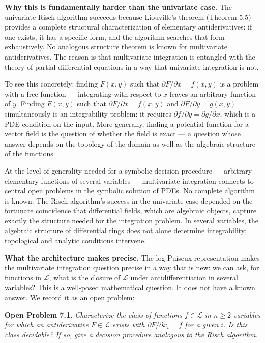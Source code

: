 \documentclass[12pt]{article}
\begin{document}
\textbf{Why this is fundamentally harder than the univariate case.} The
univariate Risch algorithm succeeds because Liouville's theorem (Theorem
5.5) provides a complete structural characterization of elementary
antiderivatives: if one exists, it has a specific form, and the
algorithm searches that form exhaustively. No analogous structure
theorem is known for multivariate antiderivatives. The reason is that
multivariate integration is entangled with the theory of partial
differential equations in a way that univariate integration is not.

To see this concretely: finding \(F(x,y)\) such that
\(\partial F/\partial x = f(x,y)\) is a problem with a free function ---
integrating with respect to \(x\) leaves an arbitrary function of \(y\).
Finding \(F(x,y)\) such that \(\partial F/\partial x = f(x,y)\) and
\(\partial F/\partial y = g(x,y)\) simultaneously is an integrability
problem: it requires \(\partial f/\partial y = \partial g/\partial x\),
which is a PDE condition on the input. More generally, finding a
potential function for a vector field is the question of whether the
field is exact --- a question whose answer depends on the topology of
the domain as well as the algebraic structure of the functions.

At the level of generality needed for a symbolic decision procedure ---
arbitrary elementary functions of several variables --- multivariate
integration connects to central open problems in the symbolic solution
of PDEs. No complete algorithm is known. The Risch algorithm's success
in the univariate case depended on the fortunate coincidence that
differential fields, which are algebraic objects, capture exactly the
structure needed for the integration problem. In several variables, the
algebraic structure of differential rings does not alone determine
integrability; topological and analytic conditions intervene.

\textbf{What the architecture makes precise.} The log-Puiseux
representation makes the multivariate integration question precise in a
way that is new: we can ask, for functions in \(\mathcal{L}\), what is
the closure of \(\mathcal{L}\) under antidifferentiation in several
variables? This is a well-posed mathematical question. It does not have
a known answer. We record it as an open problem:

\textbf{Open Problem 7.1.} \emph{Characterize the class of functions
\(f \in \mathcal{L}\) in \(n \geq 2\) variables for which an
antiderivative \(F \in \mathcal{L}\) exists with
\(\partial F / \partial x_i = f\) for a given \(i\). Is this class
decidable? If so, give a decision procedure analogous to the Risch
algorithm.}
\end{document}
